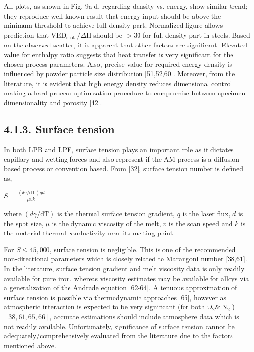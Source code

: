 \documentclass[10pt]{article}
\begin{document}
All plots, as shown in Fig. 9a-d, regarding density vs. energy, show similar trend; they reproduce well known result that energy input should be above the minimum threshold to achieve full density part. Normalized figure allows prediction that $\mathrm{VED}_{\text {spot }} / \Delta \mathrm{H}$ should be $>30$ for full density part in steels. Based on the observed scatter, it is apparent that other factors are significant. Elevated value for enthalpy ratio suggests that heat transfer is very significant for the chosen process parameters. Also, precise value for required energy density is influenced by powder particle size distribution [51,52,60]. Moreover, from the literature, it is evident that high energy density reduces dimensional control making a hard process optimization procedure to compromise between specimen dimensionality and porosity [42].

\subsection*{4.1.3. Surface tension}
In both LPB and LPF, surface tension plays an important role as it dictates capillary and wetting forces and also represent if the AM process is a diffusion based process or convention based. From [32], surface tension number is defined as,

$S=\frac{(d \gamma / \mathrm{dT}) q d}{\mu v k}$

where $(d \gamma / \mathrm{dT})$ is the thermal surface tension gradient, $q$ is the laser flux, $d$ is the spot size, $\mu$ is the dynamic viscosity of the melt, $v$ is the scan speed and $k$ is the material thermal conductivity near its melting point.

For $S \leq 45,000$, surface tension is negligible. This is one of the recommended non-directional parameters which is closely related to Marangoni number [38,61]. In the literature, surface tension gradient and melt viscosity data is only readily available for pure iron, whereas viscosity estimates may be available for alloys via a generalization of the Andrade equation [62-64]. A tenuous approximation of surface tension is possible via thermodynamic approaches [65], however as atmospheric interaction is expected to be very significant (for both $\mathrm{O}_{2} \& \mathrm{~N}_{2}$ ) $[38,61,65,66]$, accurate estimations should include atmosphere data which is not readily available. Unfortunately, significance of surface tension cannot be adequately/comprehensively evaluated from the literature due to the factors mentioned above.
\end{document}
